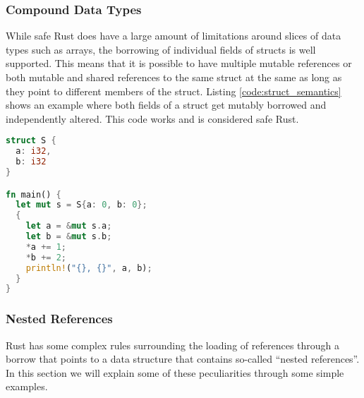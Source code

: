 \subsubsection{Compound Data Types}
While safe Rust does have a large amount of limitations around slices of data types such as arrays, the borrowing of individual fields of structs is well supported.
This means that it is possible to have multiple mutable references or both mutable and shared references to the same struct at the same as long as they point to different members of the struct.
Listing \ref{code:struct_semantics} shows an example where both fields of a struct get mutably borrowed and independently altered.
This code works and is considered safe Rust.

\begin{lstlisting}[language=Rust,frame=single,caption=Borrowing struct fields,label=code:struct_semantics]
struct S {
  a: i32,
  b: i32
}

fn main() {
  let mut s = S{a: 0, b: 0};
  {
    let a = &mut s.a;
    let b = &mut s.b;
    *a += 1;
    *b += 2;
    println!("{}, {}", a, b);
  }
}
\end{lstlisting}

\subsubsection{Nested References}
\label{sec:rust_nested}
Rust has some complex rules surrounding the loading of references through a borrow that points to a data structure that contains so-called ``nested references''.
In this section we will explain some of these peculiarities through some simple examples.

